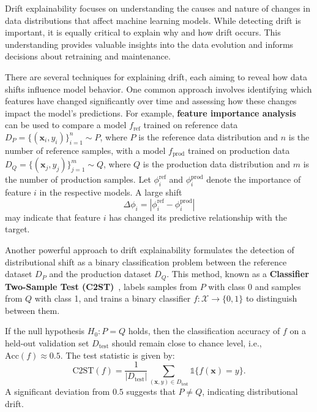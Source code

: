 Drift explainability focuses on understanding the causes and nature of changes
in data distributions that affect machine learning models. While detecting
drift is important, it is equally critical to explain why and how drift occurs.
This understanding provides valuable insights into the data evolution and
informs decisions about retraining and maintenance.

There are several techniques for explaining drift, each aiming to reveal how
data shifts influence model behavior. One common approach involves identifying
which features have changed significantly over time and assessing how these
changes impact the model's predictions. For example, \textbf{feature importance
    analysis}~\cite{feture_importance_for_drift_explainabilty} can be used to
compare a model $ f_{\text{ref}} $ trained on reference data $ D_P =
    \{(\mathbf{x}_i, y_i)\}_{i=1}^n \sim P $, where $ P $ is the reference data
distribution and $ n $ is the number of reference samples, with a model $
    f_{\text{prod}} $ trained on production data $ D_Q = \{(\mathbf{x}_j,
    y_j)\}_{j=1}^m \sim Q $, where $ Q $ is the production data distribution and $
    m $ is the number of production samples. Let $ \phi_i^{\text{ref}} $ and $
    \phi_i^{\text{prod}} $ denote the importance of feature $ i $ in the respective
models. A large shift
\begin{equation}
    \Delta \phi_i = \left| \phi_i^{\text{ref}} - \phi_i^{\text{prod}} \right|
\end{equation}
may indicate that feature $ i $ has changed its predictive relationship with the target.

Another powerful approach to drift explainability formulates the detection of
distributional shift as a binary classification problem between the reference
dataset $D_P$ and the production dataset $D_Q$. This method, known as a
\textbf{Classifier Two-Sample Test
    (C2ST)}~\cite{revisiting_two_sample_classifier}, labels samples from $P$ with
class 0 and samples from $Q$ with class 1, and trains a binary classifier $f:
    \mathcal{X} \rightarrow \{0, 1\}$ to distinguish between them.

If the null hypothesis $H_0: P = Q$ holds, then the classification accuracy of
$f$ on a held-out validation set $D_{\text{test}}$ should remain close to
chance level, i.e., $\text{Acc}(f) \approx 0.5$. The test statistic is given
by:
\begin{equation}
    \text{C2ST}(f) = \frac{1}{|D_{\text{test}}|} \sum_{(\mathbf{x}, y) \in D_{\text{test}}} \mathds{1} \{f(\mathbf{x}) = y\}.
\end{equation}
A significant deviation from $0.5$ suggests that $P \neq Q$, indicating distributional drift.

